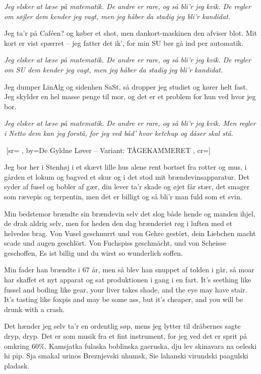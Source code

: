 \documentclass[pdftex,12pt]{article}
\begin{document}
\begin{songs}{}
\beginverse
\emph{Jeg elsker at læse på matematik.
De andre er rare, og så bli'r jeg kvik.
De regler om søjler dem kender jeg vagt,
men jeg håber da stadig jeg bli'r kandidat.}
\endverse

\beginverse
Jeg ta'r på Caféen? og køber et shot,
men dankort-maskinen den afviser blot.
Mit kort er vist spærret -- jeg fatter det ik',
for min SU bør gå ind per automatik.
\endverse

\beginverse
\emph{Jeg elsker at læse på matematik.
De andre er rare, og så bli'r jeg kvik.
De regler om SU dem kender jeg vagt,
men jeg håber da stadig jeg bli'r kandidat.}
\endverse

\beginverse
Jeg dumper LinAlg og sidenhen SaSt,
så dropper jeg studiet og kører helt fast.
Jeg skylder en hel masse penge til mor,
og det er et problem for hun ved hvor jeg bor.
\endverse

\beginverse
\emph{Jeg elsker at læse på matematik.
De andre er rare, og så bli'r jeg kvik.
Men regler i Netto dem kan jeg forstå,
for jeg ved båd' hvor ketchup og dåser skal stå.}
\endverse
\endsong



﻿%
[sr={}
,
by={De Gyldne Løver -- Variant: TÅGEKAMMERET}
,
cr={}]\hypertarget{Hjemmebrænderiet}{}
\label{song55}

\beginverse
Jeg bor her i Stenhøj i et skævt lille hus
alene rent bortset fra rotter og mus,
i gården et lokum og bagved et skur
og i det stod mit brændevinsapparatur.
Det syder af fusel og bobler af gær,
din lever ta'r skade og øjet får stær,
det smager som rævepis og terpentin,
men det er billigt og så bli'r man fuld som et svin.
\endverse

\beginverse
Min bedstemor brændte sin brændevin selv
det slog både hende og manden ihjel,
de drak aldrig selv, men for heden den dag
brænderiet røg i luften med et helvedes brag.
Von Vusel geschnurrt und von Gehre gestört,
dein Liebchen macht scade und augen geschlört.
Von Fuchspiss geschmächt, und von Scheisse geschoffen,
Es ist billig und du wirst so wunderlich soffen.
\endverse

\beginverse
Min fader han brændte i $67$ år,
men så blev han snuppet af tolden i går,
så moar har skaffet et nyt apparat
og sat produktionen i gang i en fart.
It’s seething like fussel and boiling like gear,
your liver takes shade, and the eye may have stair.
It’s tasting like foxpis and may be some ass,
but it’s cheaper, and you will be drunk with a crash.
\endverse

\beginverse
Det hænder jeg selv ta'r en ordentlig søp,
mens jeg lytter til dråbernes sagte dryp, dryp.
Det er som musik fra et fint instrument,
for jeg ved det er sprit på omkring $60\%$.
Kamsjatka fulaska boblinska gaeruska,
dju lev skinavara na oeleski hi pip.
Sja smakal urinos Breznjevski uhumsk,
Sie lahanski virundski paagulski pladask.
\endverse


\end{songs}
\end{document}
